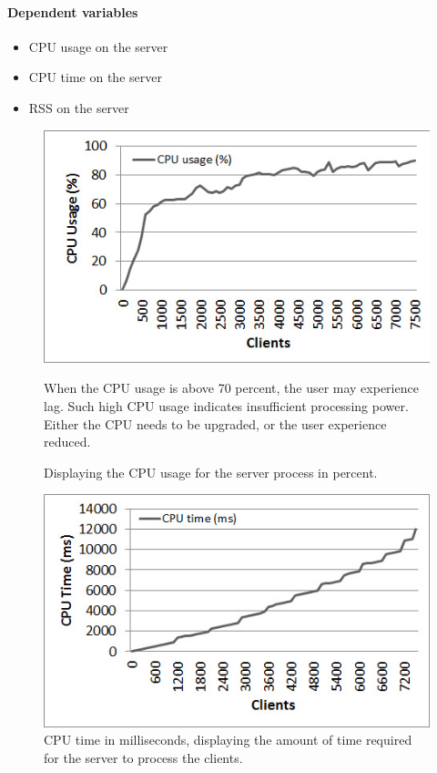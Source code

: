 \documentclass[bsc,frontabs,twoside,singlespacing,parskip,deptreport]{infthesis}     %
\begin{document}
\paragraph*{Dependent variables}
\begin{itemize}
\item CPU usage on the server
\item CPU time on the server
\item RSS on the server
\end{itemize}

\begin{center}
\begin{figure}
\centering
\includegraphics[scale=0.75]{images/test_CLIENT_CPUusage.jpg}
\caption{Displaying the CPU usage for the server process in percent.}
\label{fig:cpu_usage}
\vspace{1em}
When the CPU usage is above 70 percent, the user may experience lag. Such high CPU usage indicates insufficient processing power. Either the CPU needs to be upgraded, or the user experience reduced.
\end{figure}

\begin{figure}
\centering
\includegraphics[scale=0.75]{images/test_CLIENT_CPUtime.jpg}
\caption{CPU time in milliseconds, displaying the amount of time required for the server to process the clients.}
\label{fig:cpu_time}
\end{figure}


\end{center}
\end{document}
